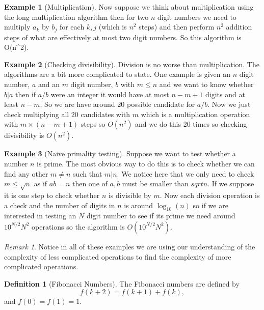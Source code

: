 \documentclass[
]{book}
\theoremstyle{definition}
\newtheorem{definition}{Definition}[chapter]
\theoremstyle{definition}
\newtheorem{example}{Example}[chapter]
\theoremstyle{definition}
\theoremstyle{definition}
\theoremstyle{remark}
\newtheorem*{remark}{Remark}
\begin{document}
\begin{example}[Multiplication]
Now suppose we think about multiplication using the long multiplication algorithm then for two \(n\) digit numbers we need to multiply \(a_k\) by \(b_j\) for each \(k, j\) (which is \(n^2\) steps) and then perform \(n^2\) addition steps of what are effectively at most two digit numbers. So this algorithm is O(n\^{}2).
\end{example}

\begin{example}[Checking divisibility]
Division is no worse than multiplication. The algorithms are a bit more complicated to state. One example is given an \(n\) digit number, \(a\) and an \(m\) digit number, \(b\) with \(m\leq n\) and we want to know whether \(b|a\) then if \(a/b\) were an integer it would have at most \(n-m+1\) digits and at least \(n-m\). So we are have around \(20\) possible candidate for \(a/b\). Now we just check multiplying all \(20\) candidates with \(m\) which is a multiplication operation with \(m\times(n-m+1)\) steps so \(O(n^2)\) and we do this 20 times so checking divisibility is \(O(n^2)\).
\end{example}

\begin{example}[Naive primality testing]
Suppose we want to test whether a number \(n\) is prime. The most obvious way to do this is to check whether we can find any other \(m \neq n\) such that \(m|n\). We notice here that we only need to check \(m \leq \sqrt{n}\) as if \(ab=n\) then one of \(a, b\) must be smaller than \(sqrt{n}\). If we suppose it is one step to check whether \(n\) is divisible by \(m\). Now each division operation is a check and the number of digits in \(n\) is around \(\log_{10}(n)\) so if we are interested in testing an \(N\) digit number to see if its prime we need around \(10^{N/2}N^2\) operations so the algorithm is \(O(10^{N/2} N^2)\).
\end{example}

\begin{remark}
Notice in all of these examples we are using our understanding of the complexity of less complicated operations to find the complexity of more complicated operations.
\end{remark}

\begin{definition}[Fibonacci Numbers]
The Fibonacci numbers are defined by
\[ f(k+2) = f(k+1 ) + f(k),  \] and \(f(0)=f(1)=1\).
\end{definition}
\end{document}
